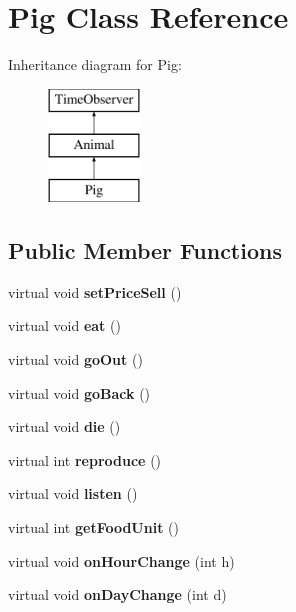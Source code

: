 \hypertarget{class_pig}{}\section{Pig Class Reference}
\label{class_pig}
Inheritance diagram for Pig\+:\begin{figure}[H]
\begin{center}
\leavevmode
\includegraphics[height=3.000000cm]{class_pig}
\end{center}
\end{figure}
\subsection*{Public Member Functions}
\begin{DoxyCompactItemize}
\item 
\mbox{\label{class_pig_a0211e2fe87af7df616125ea0c3c49b9b}} 
virtual void {\bfseries set\+Price\+Sell} ()
\item 
\mbox{\label{class_pig_a101d2ba5c0384f287a4d762c0b103929}} 
virtual void {\bfseries eat} ()
\item 
\mbox{\label{class_pig_a346e5a198e9a2208afda64f271e18ce4}} 
virtual void {\bfseries go\+Out} ()
\item 
\mbox{\label{class_pig_a8910acc68ea058501b8bb9d2e104f3db}} 
virtual void {\bfseries go\+Back} ()
\item 
\mbox{\label{class_pig_ac6f4adb5d005de651af8b2769f693638}} 
virtual void {\bfseries die} ()
\item 
\mbox{\label{class_pig_a50a4bb2ccc915d430270b032a463de66}} 
virtual int {\bfseries reproduce} ()
\item 
\mbox{\label{class_pig_a378287d4b572a3d803e2066ec1a5176a}} 
virtual void {\bfseries listen} ()
\item 
\mbox{\label{class_pig_ada79ebb335bc8e660aa649ebc4ada73f}} 
virtual int {\bfseries get\+Food\+Unit} ()
\item 
\mbox{\label{class_pig_a23b39de69985c6128a71d6f2f8bf034a}} 
virtual void {\bfseries on\+Hour\+Change} (int h)
\item 
\mbox{\label{class_pig_a217d0b26a1919076b5f0d8b5869ab8cc}} 
virtual void {\bfseries on\+Day\+Change} (int d)
\end{DoxyCompactItemize}
